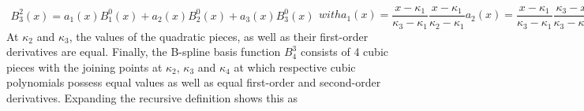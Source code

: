 \begin{subequations}
	\begin{align}
		B_3^2(x) = a_1(x) B_1^0(x) + a_2(x) B_2^0(x) + a_3(x) B_3^0(x)
	\end{align}
	with
	\begin{equation}
		a_1(x) = \frac{x-\kappa_1}{\kappa_3 - \kappa_1} \frac{x - \kappa_1}{\kappa_2 - \kappa_1}
	\end{equation}
	\begin{equation}
		a_2(x) = \frac{x - \kappa_1}{\kappa_3 - \kappa_1} \frac{\kappa_3 - x}{\kappa_3 - \kappa_2} + \frac{\kappa_4 - x}{\kappa_4 - \kappa_2} \frac{x - \kappa_2}{\kappa_3 - \kappa_2}
	\end{equation}
	\begin{equation}
		a_3(x) = \frac{\kappa_4 - x}{\kappa_4 - \kappa_2} \frac{\kappa_4 - x}{\kappa_4 - \kappa_3}.	
	\end{equation}
\end{subequations}
%
At $\kappa_2$ and $\kappa_3$, the values of the quadratic pieces, as well as their first-order derivatives are equal. Finally, the B-spline basis function $B_4^3$ consists of 4 cubic pieces with the joining points at $\kappa_2$, $\kappa_3$ and $\kappa_4$ at which respective cubic polynomials possess equal values as well as equal first-order and second-order derivatives. Expanding the recursive definition shows this as

